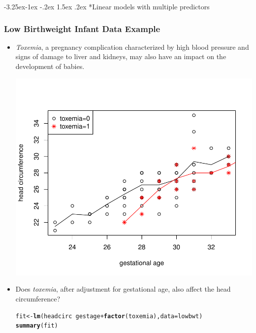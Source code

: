 \documentclass[final]{article}\usepackage[]{graphicx}\usepackage[svgnames]{xcolor}
\makeatletter
\def\maxwidth{ %
  \ifdim\Gin@nat@width>\linewidth
    \linewidth
  \else
    \Gin@nat@width
  \fi
}
\newcommand{\hlopt}[1]{\textcolor[rgb]{0,0,0}{#1}}%
\newcommand{\hlstd}[1]{\textcolor[rgb]{0.345,0.345,0.345}{#1}}%
\newcommand{\hlkwb}[1]{\textcolor[rgb]{0.69,0.353,0.396}{#1}}%
\newcommand{\hlkwc}[1]{\textcolor[rgb]{0.333,0.667,0.333}{#1}}%
\newcommand{\hlkwd}[1]{\textcolor[rgb]{0.737,0.353,0.396}{\textbf{#1}}}%
\newenvironment{kframe}{%
 \def\at@end@of@kframe{}%
 \ifinner\ifhmode%
  \def\at@end@of@kframe{\end{minipage}}%
  \begin{minipage}{\columnwidth}%
 \fi\fi%
 \def\FrameCommand##1{\hskip\@totalleftmargin \hskip-\fboxsep
 \colorbox{shadecolor}{##1}\hskip-\fboxsep
     \hskip-\linewidth \hskip-\@totalleftmargin \hskip\columnwidth}%
 \MakeFramed {\advance\hsize-\width
   \@totalleftmargin\z@ \linewidth\hsize
   \@setminipage}}%
 {\par\unskip\endMakeFramed%
 \at@end@of@kframe}
\newenvironment{knitrout}{}{} %
\renewcommand\subsection{\@startsection{subsection}{2}{\z@}%
                                     {-3.25ex\@plus -1ex \@minus -.2ex}%
                                     {1.5ex \@plus .2ex}%
                                     {\normalfont\large\bfseries\scshape\color{Blue}}}
\makeatother
\begin{document}
\subsection*{Linear models with multiple predictors}
\subsubsection*{Low Birthweight Infant Data Example}
\begin{itemize}
    \item \emph{Toxemia}, a pregnancy complication characterized by high blood pressure
          and signs of damage to liver and kidneys, may also have an impact on the
          development of babies.
\begin{knitrout}
\color{fgcolor}

{\centering \includegraphics[width=\maxwidth]{figure/unnamed-chunk-11-1} 

}


\end{knitrout}
    \item Does \emph{toxemia}, after adjustment for gestational age, also affect the head
          circumference?
\begin{knitrout}
\color{fgcolor}\begin{kframe}
\begin{alltt}
\hlstd{fit} \hlkwb{<-} \hlkwd{lm}\hlstd{(headcirc} \hlopt{~} \hlstd{gestage} \hlopt{+} \hlkwd{factor}\hlstd{(toxemia),} \hlkwc{data} \hlstd{= lowbwt)}
\hlkwd{summary}\hlstd{(fit)}
\end{alltt}
\begin{verbatim}


\end{verbatim}
\end{kframe}
\end{knitrout}
\end{itemize}
\end{document}
